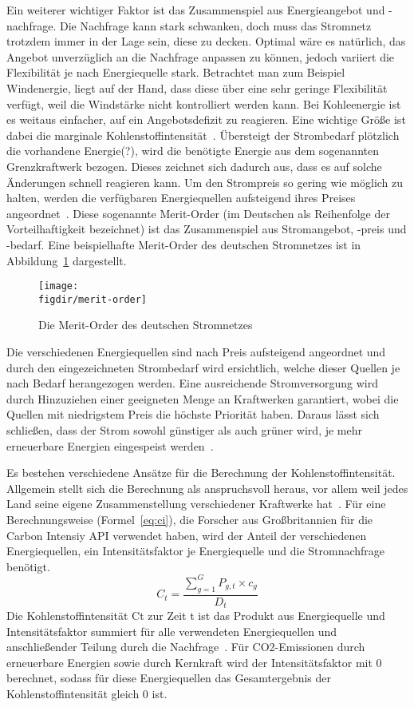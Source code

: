 Ein weiterer wichtiger Faktor ist das Zusammenspiel aus Energieangebot und -nachfrage.
Die Nachfrage kann stark schwanken, doch muss das Stromnetz trotzdem immer in der Lage sein, diese zu decken.
Optimal wäre es natürlich, das Angebot unverzüglich an die Nachfrage anpassen zu können, jedoch variiert die Flexibilität je nach Energiequelle stark.
Betrachtet man zum Beispiel Windenergie, liegt auf der Hand, dass diese über eine sehr geringe Flexibilität verfügt, weil die Windstärke nicht kontrolliert werden kann.
Bei Kohleenergie ist es weitaus einfacher, auf ein Angebotsdefizit zu reagieren.
Eine wichtige Größe ist dabei die marginale Kohlenstoffintensität~\cite{GreenSoftwareFoundation.2022}.
Übersteigt der Strombedarf plötzlich die vorhandene Energie(?), wird die benötigte Energie aus dem sogenannten Grenzkraftwerk bezogen.
Dieses zeichnet sich dadurch aus, dass es auf solche Änderungen schnell reagieren kann.
Um den Strompreis so gering wie möglich zu halten, werden die verfügbaren Energiequellen aufsteigend ihres Preises angeordnet~\cite{Corradi.20231207T10:48:51.000Z}.
Diese sogenannte Merit-Order (im Deutschen als Reihenfolge der Vorteilhaftigkeit bezeichnet) ist das Zusammenspiel aus Stromangebot, -preis und -bedarf.
Eine beispielhafte Merit-Order des deutschen Stromnetzes ist in Abbildung~\ref{FIG:merit-order} dargestellt.
\begin{figure}
 \caption{Die Merit-Order des deutschen Stromnetzes~\cite{Gro.5.10.2022}}
 {\texttt{[image: \\figdir/merit-order]}}
 \label{FIG:merit-order}
\end{figure}
Die verschiedenen Energiequellen sind nach Preis aufsteigend angeordnet und durch den eingezeichneten Strombedarf wird ersichtlich, welche dieser Quellen je nach Bedarf herangezogen werden.
Eine ausreichende Stromversorgung wird durch Hinzuziehen einer geeigneten Menge an Kraftwerken garantiert, wobei die Quellen mit niedrigstem Preis die höchste Priorität haben.
Daraus lässt sich schließen, dass der Strom sowohl günstiger als auch grüner wird, je mehr erneuerbare Energien eingespeist werden~\cite{Gro.5.10.2022}.

Es bestehen verschiedene Ansätze für die Berechnung der Kohlenstoffintensität.
Allgemein stellt sich die Berechnung als anspruchsvoll heraus, vor allem weil jedes Land seine eigene Zusammenstellung verschiedener Kraftwerke hat~\cite{Currie.2024}.
Für eine Berechnungsweise (Formel~\ref{eq:ci}), die Forscher aus Großbritannien für die Carbon Intensiy API verwendet haben, wird der Anteil der verschiedenen Energiequellen, ein Intensitätsfaktor je Energiequelle und die Stromnachfrage benötigt.
\begin{equation}
 \label{eq:ci}
 C_t = \frac{\sum_{g=1}^{G} P_{g,t} \times c_g}{D_t}
\end{equation}
Die Kohlenstoffintensität Ct zur Zeit t ist das Produkt aus Energiequelle und Intensitätsfaktor summiert für alle verwendeten Energiequellen und anschließender Teilung durch die Nachfrage~\cite{LyndonRuffAlasdairBruceJamesKellowayFraserMacMillanAlexRogers.2021}.
Für CO2-Emissionen durch erneuerbare Energien sowie durch Kernkraft wird der Intensitätsfaktor mit 0 berechnet, sodass für diese Energiequellen das Gesamtergebnis der Kohlenstoffintensität gleich 0 ist.

